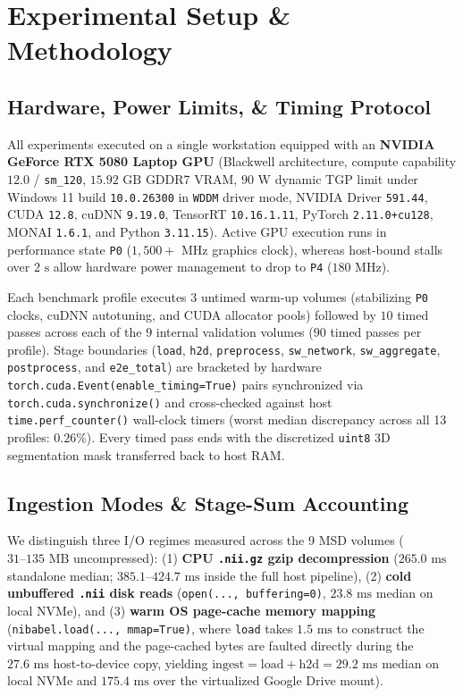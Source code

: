 \documentclass[10pt,twocolumn]{article}
\begin{document}
\section{Experimental Setup \& Methodology}

\subsection{Hardware, Power Limits, \& Timing Protocol}
All experiments executed on a single workstation equipped with an \textbf{NVIDIA GeForce RTX 5080 Laptop GPU} (Blackwell architecture, compute capability $12.0$ / \texttt{sm\_120}, $15.92\text{ GB}$ GDDR7 VRAM, $90\text{ W}$ dynamic TGP limit under Windows 11 build \texttt{10.0.26300} in \texttt{WDDM} driver mode, NVIDIA Driver \texttt{591.44}, CUDA \texttt{12.8}, cuDNN \texttt{9.19.0}, TensorRT \texttt{10.16.1.11}, PyTorch \texttt{2.11.0+cu128}, MONAI \texttt{1.6.1}, and Python \texttt{3.11.15}). Active GPU execution runs in performance state \texttt{P0} ($1,500+\text{ MHz}$ graphics clock), whereas host-bound stalls over $2\text{ s}$ allow hardware power management to drop to \texttt{P4} ($180\text{ MHz}$).

Each benchmark profile executes $3$ untimed warm-up volumes (stabilizing \texttt{P0} clocks, cuDNN autotuning, and CUDA allocator pools) followed by $10$ timed passes across each of the $9$ internal validation volumes ($90$ timed passes per profile). Stage boundaries (\texttt{load}, \texttt{h2d}, \texttt{preprocess}, \texttt{sw\_network}, \texttt{sw\_aggregate}, \texttt{postprocess}, and \texttt{e2e\_total}) are bracketed by hardware \texttt{torch.cuda.Event(enable\_timing=True)} pairs synchronized via \texttt{torch.cuda.synchronize()} and cross-checked against host \texttt{time.perf\_counter()} wall-clock timers (worst median discrepancy across all 13 profiles: $0.26\%$). Every timed pass ends with the discretized \texttt{uint8} 3D segmentation mask transferred back to host RAM.

\subsection{Ingestion Modes \& Stage-Sum Accounting}
We distinguish three I/O regimes measured across the 9 MSD volumes ($31\text{--}135\text{ MB}$ uncompressed): (1) \textbf{CPU \texttt{.nii.gz} gzip decompression} ($265.0\text{ ms}$ standalone median; $385.1\text{--}424.7\text{ ms}$ inside the full host pipeline), (2) \textbf{cold unbuffered \texttt{.nii} disk reads} (\texttt{open(..., buffering=0)}, $23.8\text{ ms}$ median on local NVMe), and (3) \textbf{warm OS page-cache memory mapping} (\texttt{nibabel.load(..., mmap=True)}, where \texttt{load} takes $1.5\text{ ms}$ to construct the virtual mapping and the page-cached bytes are faulted directly during the $27.6\text{ ms}$ host-to-device copy, yielding $\text{ingest} = \text{load} + \text{h2d} = 29.2\text{ ms}$ median on local NVMe and $175.4\text{ ms}$ over the virtualized Google Drive mount).
\end{document}
